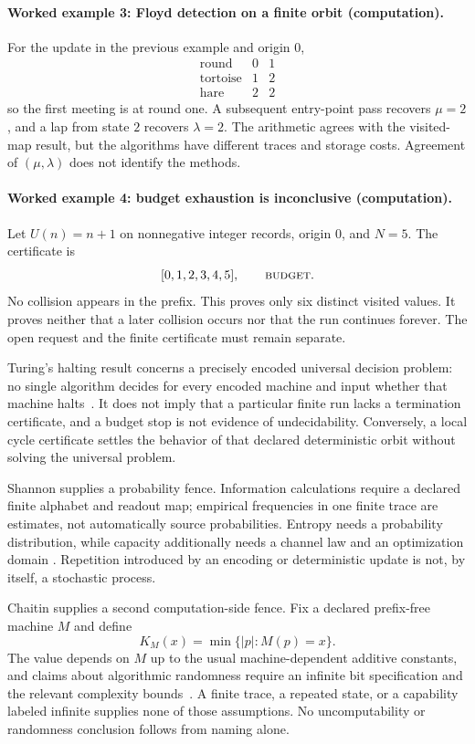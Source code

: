 \paragraph{Worked example 3: Floyd detection on a finite orbit (computation).}
For the update in the previous example and origin \(0\),
\[
\begin{array}{c|cc}
\text{round}&0&1\\ \hline
\text{tortoise}&1&2\\
\text{hare}&2&2
\end{array}
\]
so the first meeting is at round one.  A subsequent entry-point pass recovers \(\mu=2\), and a lap from state \(2\)
recovers \(\lambda=2\).  The arithmetic agrees with the visited-map
result, but the algorithms have different traces and storage costs.  Agreement of \((\mu,\lambda)\) does not identify
the methods.

\paragraph{Worked example 4: budget exhaustion is inconclusive (computation).}
Let \(U(n)=n+1\) on nonnegative integer records, origin \(0\), and \(N=5\).  The certificate is
\[
                         [0,1,2,3,4,5],\qquad\textsc{budget}.
\]
No collision appears in the prefix.  This proves only six distinct visited values.  It proves neither that a later
collision occurs nor that the run continues forever.  The open request and the finite certificate must remain
separate.

Turing's halting result concerns a precisely encoded universal decision problem: no single algorithm decides for
every encoded machine and input whether that machine halts~\cite{turing1936}.  It does not imply that a particular
finite run lacks a termination certificate, and a budget stop is not evidence of undecidability.  Conversely, a local cycle
certificate settles the behavior of that declared deterministic orbit without solving the universal problem.

Shannon supplies a probability fence.  Information calculations require a declared finite alphabet and readout map;
empirical frequencies in one finite trace are estimates, not automatically source probabilities.  Entropy needs a
probability distribution, while capacity additionally needs a channel law and an optimization domain
\cite{shannon1948}.  Repetition introduced by an encoding or deterministic update is not, by itself, a stochastic
process.

Chaitin supplies a second computation-side fence.  Fix a declared prefix-free machine \(M\) and define
\[
                         K_M(x)=\min\{|p|:M(p)=x\}.
\]
The value depends on \(M\) up to the usual machine-dependent additive constants, and claims about algorithmic
randomness require an infinite bit specification and the relevant complexity bounds~\cite{chaitin1974}.  A finite
trace, a repeated state, or a capability labeled infinite supplies none of those assumptions.  No uncomputability or
randomness conclusion follows from naming alone.

